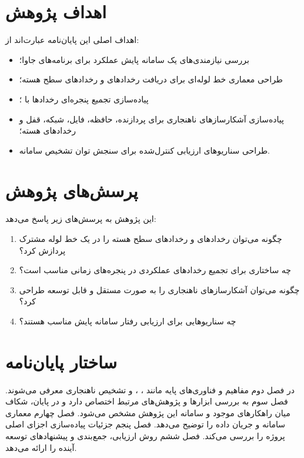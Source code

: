 \section{اهداف پژوهش}

اهداف اصلی این پایان‌نامه عبارت‌اند از:

\begin{itemize}
    \item بررسی نیازمندی‌های یک سامانه پایش عملکرد برای برنامه‌های جاوا؛
    \item طراحی معماری خط لوله‌ای برای دریافت رخدادهای  و
    رخدادهای سطح هسته؛
    \item پیاده‌سازی تجمیع پنجره‌ای رخدادها با ؛
    \item پیاده‌سازی آشکارسازهای ناهنجاری برای پردازنده، حافظه، فایل،
    شبکه، قفل و رخدادهای هسته؛
    \item طراحی سناریوهای ارزیابی کنترل‌شده برای سنجش توان تشخیص سامانه.
\end{itemize}

\section{پرسش‌های پژوهش}

این پژوهش به پرسش‌های زیر پاسخ می‌دهد:

\begin{enumerate}
    \item چگونه می‌توان رخدادهای  و رخدادهای سطح هسته را در یک
    خط لوله مشترک پردازش کرد؟
    \item چه ساختاری برای تجمیع رخدادهای عملکردی در پنجره‌های زمانی مناسب است؟
    \item چگونه می‌توان آشکارسازهای ناهنجاری را به صورت مستقل و قابل توسعه
    طراحی کرد؟
    \item چه سناریوهایی برای ارزیابی رفتار سامانه پایش مناسب هستند؟
\end{enumerate}

\section{ساختار پایان‌نامه}

در فصل دوم مفاهیم و فناوری‌های پایه مانند ، ،
 و تشخیص ناهنجاری معرفی می‌شوند. فصل سوم به بررسی ابزارها و
پژوهش‌های مرتبط اختصاص دارد و در پایان، شکاف میان راهکارهای موجود و
سامانه این پژوهش مشخص می‌شود. فصل چهارم معماری سامانه و جریان داده را
توضیح می‌دهد. فصل پنجم جزئیات پیاده‌سازی اجزای اصلی پروژه را بررسی
می‌کند. فصل ششم روش ارزیابی، جمع‌بندی و پیشنهادهای توسعه آینده را ارائه
می‌دهد.
